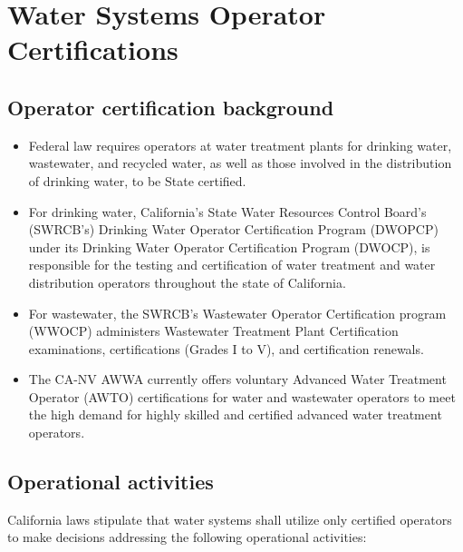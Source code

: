 \chapter{Water Systems Operator Certifications}
\section{Operator certification background}
\begin{itemize}
\item Federal law requires operators at water treatment plants for drinking water, wastewater, and recycled water, as well as those involved in the distribution of drinking water, to be State certified.  

\item For drinking water, California's State Water Resources Control Board's (SWRCB's) Drinking Water Operator Certification Program (DWOPCP) under its Drinking Water Operator Certification Program (DWOCP), is responsible for the testing and certification of water treatment and water distribution operators throughout the state of California.

\item For wastewater, the SWRCB's Wastewater Operator Certification program (WWOCP) administers Wastewater Treatment Plant Certification examinations, certifications (Grades I to V), and certification renewals.

\item The CA-NV AWWA currently offers voluntary Advanced Water Treatment Operator (AWTO) certifications for water and wastewater operators to meet the high demand for highly skilled and certified advanced water treatment operators.

\end{itemize}

\section{Operational activities}
California laws stipulate that water systems shall utilize only certified operators to make decisions addressing the following operational activities:\\
